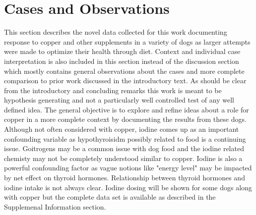 \newcommand{\mjmhersheytext}{
Hershey quickly demonstrated several problems not long after arrival.
He had problems with his fur, digestion, and coughing while ultimately
being diagnosed with heart failure and bladder stones.
During his time here, his diet was varied and he was observed
for overall eating and behavior with specific interest in 
coughing and ability to make it up a short flight of steps
from the backyard to the deck. As has often been the case, the notes 
were not sufficient
to fully capture the dynamics of his condition but some representative
ones have been edited into the above list. Some correspondence with
copper intake is noted. In the last few days of his life, he
would pass out and quickly regain consciousness until one day 
he did not recover presumably due to heart failure. 
As many initial features could be rationalized as related to thyroid output,
his iodine intake was elevated. 
In retropsect, his initial response to increased copper may have been
to be more energetic but that increased his coughing leading
to a dosage reduction. The time scale analysis for various conditions that
may relate to copper deficiency is consistent with this idea making
the prognosis for coughing reduction and increased energy good with continued
copper and maybe other nutrients.  
Clearly the data are incomplete but suggestive
now of some benefits. 

} %






\section{Cases and Observations}




This section describes the 
novel data collected for this work documenting
response to copper and other supplements in a variety of dogs
as larger attempts were made to optimize their health through diet.
Context and individual case interpretation is also included in this section
 instead of the
discussion section which mostly contains  general observations
about the cases and more complete comparison to prior work discussed
in the introductory text.  
As should be clear from the introductory and concluding remarks
this work is meant to be hypothesis generating and not a particularly
well controlled test of any well defined idea.  The general objective
is to explore and refine ideas about a role for copper in a more
complete context by documenting the results from these dogs. 
Although not often considered with copper, iodine comes up as
an important confounding variable as hypothyroisidm possibly
related to food is a continuing issue. 
Goitrogens may be a common issue with dog food and the iodine related
chemisty
may not be completely understood similar to copper. 
Iodine is also a powerful confounding factor as vague notions
like "energy level" may be impacted by net effect on thyroid
hormones. Relationship between thyroid hormones and iodine intake
is not always clear. Iodine dosing will be shown for some dogs
along with copper but the complete data set is available
as described in the Supplemenal Information section.  




